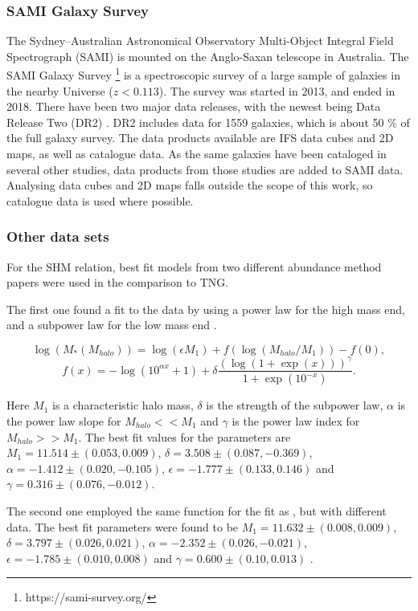 \subsubsection{SAMI Galaxy Survey}
The Sydney–Australian Astronomical Observatory Multi-Object Integral Field Spectrograph (SAMI) is mounted on the Anglo-Saxan telescope in Australia. The SAMI Galaxy Survey \footnote{https://sami-survey.org/} is a spectroscopic survey of a large sample of galaxies in the nearby Universe ($z < 0.113$). The survey was started in 2013, and ended in 2018. There have been two major data releases, with the newest being Data Release Two (DR2) \parencite{Scott2018}. DR2 includes data for 1559 galaxies, which is about 50 \% of the full galaxy survey. The data products available are IFS data cubes and 2D maps, as well as catalogue data. As the same galaxies have been cataloged in several other studies, data products from those studies are added to SAMI data. Analysing data cubes and 2D maps falls outside the scope of this work, so catalogue data is used where possible. 

\subsubsection{Other data sets}
For the SHM relation, best fit models from two different abundance method papers were used in the comparison to TNG.

The first one found a fit to the data by using a power law for the high mass end, and a subpower law for the low mass end \parencite{Behroozi2013}.

\begin{equation} \label{eq_behroozi}
    \log(M_*(M_{halo})) = \log(\epsilon M_1) + f(\log(M_{halo}/M_1)) -f(0),
\end{equation}
\begin{equation*}
    f(x) = -\log(10^{\alpha x}+1)+\delta \frac{(\log(1+\exp(x)))^\gamma}{1 +\exp(10^{-x})}.
\end{equation*}

Here $M_1$ is a characteristic halo mass, $\delta$ is the strength of the subpower law, $\alpha$ is the power law slope for $M_{halo} << M_1$ and $\gamma$ is the power law index for $M_{halo} >> M_1$. The best fit values for the parameters are $M_1 = 11.514\pm(0.053, 0.009)$, $\delta = 3.508 \pm (0.087, -0.369)$, $\alpha = -1.412 \pm (0.020, -0.105)$, $\epsilon = -1.777 \pm (0.133, 0.146)$ and $\gamma = 0.316 \pm (0.076, -0.012)$.

The second one employed the same function for the fit as \textcite{Behroozi2013}, but with different data. The best fit parameters were found to be $M_1 = 11.632\pm(0.008, 0.009)$, $\delta = 3.797 \pm (0.026, 0.021)$, $\alpha = -2.352 \pm (0.026, -0.021)$, $\epsilon = -1.785 \pm (0.010, 0.008)$  and $\gamma = 0.600 \pm (0.10, 0.013)$ \parencite{Zanisi2019}.

